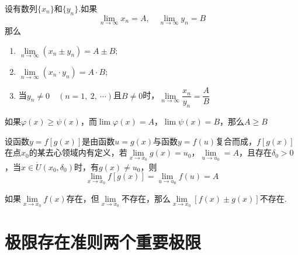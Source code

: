 \documentclass[lang=cn,10pt]{elegantbook}
\begin{document}
\begin{theorem}
	设有数列\( \{x_{n}\} \)和\( \{y_{n}\} \).如果
	\[ \lim\limits_{n \to \infty}x_{n} = A,\quad \lim\limits_{n \to \infty}y_{n} = B \]
	那么
	\begin{enumerate}
		\item \( \lim\limits_{n \to \infty}(x_{n} \pm y_{n}) = A \pm B \);
		\item \( \lim\limits_{n \to \infty}(x_{n} \cdot y_{n}) = A \cdot B \);
		\item 当\( y_{n} \neq 0\quad(n =1,\ 2,\ \cdots) \)且\( B \neq 0 \)时，\( \lim\limits_{n \to \infty}\dfrac{x_{n}}{y_{n}} = \dfrac{A}{B} \)
	\end{enumerate}
\end{theorem}

\begin{theorem}
	如果\( \varphi (x) \geqslant \psi (x) \)，而\( \lim \varphi (x) = A \)，\( \lim \psi (x) = B \)，那么\( A \geqslant B \)
\end{theorem}

\begin{theorem}[复合函数的极限运算法则]
	设函数\( y = f[g(x)] \)是由函数\( u = g(x) \)与函数\( y = f(u) \)复合而成，\( f[g(x)] \)在点\( x_{0} \)的某去心领域内有定义，若\( \lim\limits_{x \to x_{0}}g(x) = u_{0} \)，\( \lim\limits_{u \to u_{0}} = A \)，且存在\( \delta_{0} > 0 \)，当\( x \in \mathring{U}(x_{0}, \delta_{0}) \)时，有\( g(x) \neq u_{0} \)，则
	\[ \lim\limits_{x \to x_{0}}f[g(x)] = \lim\limits_{u \to u_{0}}f(u) = A \]
\end{theorem}

\begin{theorem}
	如果\( \lim\limits_{x \to x_{0}}f(x) \)存在，但\( \lim\limits_{x \to x_{0}} \)不存在，那么\( \lim\limits_{x \to x_{0}}[f(x) \pm g(x)] \)不存在.
\end{theorem}

\section{极限存在准则\quad 两个重要极限}
\end{document}
